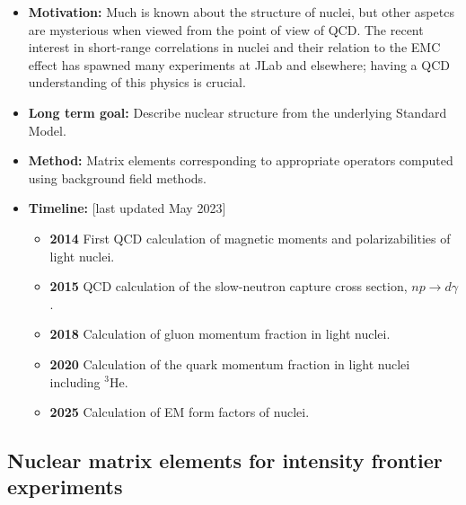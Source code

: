 \documentclass[12pt,hyperpdf]{article}
\begin{document}
\begin{itemize}  
    \item{\bf Motivation:} Much is known about the structure of nuclei, but other aspetcs are mysterious when viewed from the point of view of QCD. The recent interest in short-range correlations in nuclei and their relation to the EMC effect has spawned many experiments at JLab and elsewhere; having a QCD understanding of this physics is crucial. 
    
    \item{\bf Long term goal:} Describe nuclear structure from the underlying Standard Model. 
    
    \item{\bf Method:} Matrix elements corresponding to appropriate operators computed using background field methods.
      
\item{\bf Timeline:} \hfill [last updated May 2023]
\begin{itemize}
    \item{\bf 2014} First QCD calculation of magnetic moments and polarizabilities of light nuclei.
    \item{\bf 2015} QCD calculation of the slow-neutron capture cross section, $np\to d\gamma$.
\item{\bf 2018} Calculation of gluon momentum fraction in light nuclei.
    \item{\bf 2020} Calculation of the quark momentum fraction in light nuclei including $^3$He. 
    \item{\bf 2025} Calculation of EM form factors of nuclei.
\end{itemize}
\end{itemize}

\subsection{Nuclear matrix elements for intensity frontier experiments}
\end{document}
